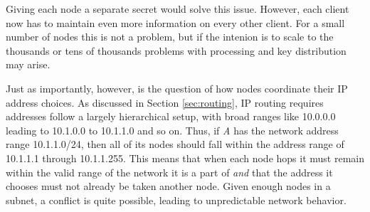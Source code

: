 \par Giving each node a separate secret would solve this issue. However, each client now has to maintain even more information on every other client. For a small number of nodes this is not a problem, but if the intenion is to scale to the thousands or tens of thousands problems with processing and key distribution may arise.  

\par Just as importantly, however, is the question of how nodes coordinate their IP address choices. As discussed in Section \ref{sec:routing}, IP routing requires addresses follow a largely hierarchical setup, with broad ranges like 10.0.0.0 leading to 10.1.0.0 to 10.1.1.0 and so on. Thus, if \textit{A} has the network address range 10.1.1.0/24, then all of its nodes should fall within the address range of 10.1.1.1 through 10.1.1.255. This means that when each node hops it must remain within the valid range of the network it is a part of \textit{and} that the address it chooses must not already be taken another node. Given enough nodes in a subnet, a conflict is quite possible, leading to unpredictable network behavior. 



